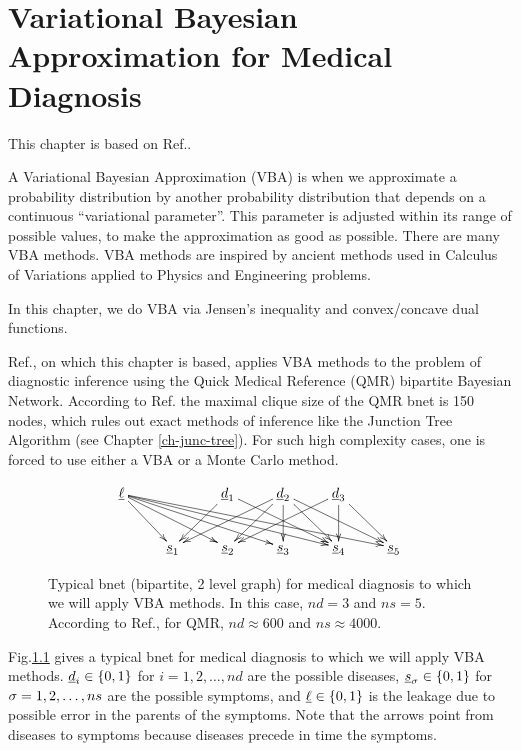 \chapter{Variational Bayesian Approximation
for Medical Diagnosis}
\label{ch-var-bay-medical}

This chapter is based
on Ref.\cite{jaak-jordan}.

A Variational Bayesian Approximation (VBA)
is when we approximate
a probability distribution
by another 
probability distribution that depends
on a continuous \enquote{variational parameter}.
This parameter is
adjusted 
within its range of possible values,
to make the approximation
as good as possible.
There are many VBA methods.
VBA methods are inspired by 
ancient  methods
used in Calculus 
of Variations applied to Physics
and Engineering problems.

In this chapter,
we do VBA  via
Jensen's inequality and
convex/concave dual functions.

Ref.\cite{jaak-jordan}, on which
this chapter is based,
applies VBA methods to the problem of diagnostic inference using the Quick Medical Reference (QMR) bipartite Bayesian Network. 
According to Ref.\cite{jaak-jordan} 
the maximal clique size of the QMR 
bnet is
150 nodes, which rules out exact methods
of inference like the Junction Tree Algorithm
(see Chapter \ref{ch-junc-tree}).
For such high complexity cases,
one is forced to use
either a VBA or a Monte Carlo method.

\begin{figure}[h!]
$$\xymatrix{
\ul{\ell}
\ar[dr]\ar[drr]\ar[drrr]\ar[drrrr]\ar[drrrrr]
&
&\rvd_1\ar[dl]\ar[drr]
&\rvd_2\ar[dll]\ar[dl]\ar[dr]\ar[d]\ar[drr]
&\rvd_3\ar[dll]\ar[d]\ar[dr]
\\
&\rvs_1
&\rvs_2
&\rvs_3
&\rvs_4
&\rvs_5
}$$
\caption{
Typical bnet (bipartite, 2 level graph) 
for medical diagnosis
to which we will apply VBA
methods.
In this case, $nd=3$ and
$ns=5$. 
According to Ref.\cite{jaak-jordan},
for QMR, $nd\approx 600$ 
and $ns\approx 4000$.
}
\label{fig-var-bay-med-bnet}
\end{figure}

Fig.\ref{fig-var-bay-med-bnet}
gives a typical bnet
for medical diagnosis
to which we will apply VBA methods.
${\underline{d}}_i\in \{0,1\}$
for $i=1,2, \ldots, nd$
are the possible diseases,
${\underline{s}}_\sigma\in\{0,1\}$ 
for $\sigma=1,2, \ldots, ns$ are the possible
symptoms, and $\underline{\ell}\in\{0,1\}$
is the leakage  due to 
possible error in 
the parents of the symptoms.
Note that the 
arrows point from
diseases to symptoms
because diseases precede
in time
the symptoms.

